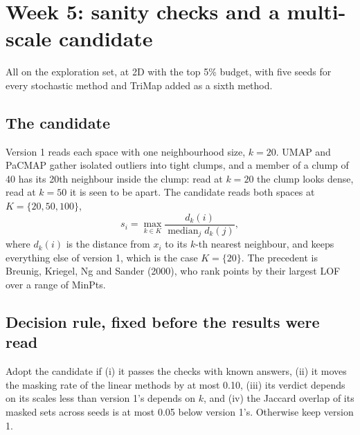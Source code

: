 %

\section*{Week 5: sanity checks and a multi-scale candidate}

All on the exploration set, at 2D with the top 5\% budget, with five seeds
for every stochastic method and TriMap added as a sixth method.

\subsection*{The candidate}

Version 1 reads each space with one neighbourhood size, $k = 20$. UMAP and
PaCMAP gather isolated outliers into tight clumps, and a member of a clump
of 40 has its 20th neighbour inside the clump: read at $k = 20$ the clump
looks dense, read at $k = 50$ it is seen to be apart. The candidate reads
both spaces at $K = \{20, 50, 100\}$,
\begin{equation*}
  s_i = \max_{k \in K} \frac{d_k(i)}{\operatorname{median}_j d_k(j)},
\end{equation*}
where $d_k(i)$ is the distance from $x_i$ to its $k$-th nearest neighbour,
and keeps everything else of version 1, which is the case $K = \{20\}$. The
precedent is Breunig, Kriegel, Ng and Sander (2000), who rank points by their
largest LOF over a range of MinPts.

\subsection*{Decision rule, fixed before the results were read}

Adopt the candidate if (i) it passes the checks with known answers, (ii) it
moves the masking rate of the linear methods by at most 0.10, (iii) its
verdict depends on its scales less than version 1's depends on $k$, and (iv)
the Jaccard overlap of its masked sets across seeds is at most 0.05 below
version 1's. Otherwise keep version 1.

